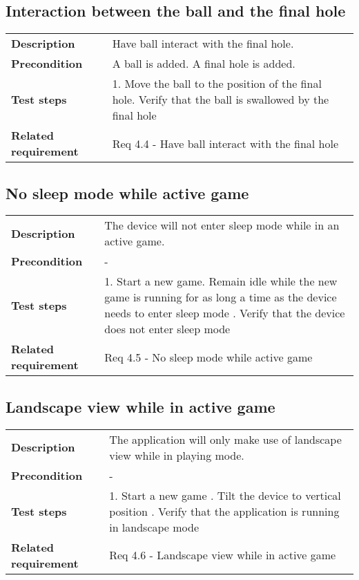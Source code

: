 \documentclass[a4paper,titlepage]{article}
\begin{document}
\subsection{Interaction between the ball and the final hole}
\begin{tabularx}{\textwidth}{lX}
	\textbf{Description}	&
		Have ball interact with the final hole.\\
	\textbf{Precondition}	&
		A ball is added.\newline
		A final hole is added.\\
	\textbf{Test steps}	&
		1. Move the ball to the position of the final hole\newline
		2. Verify that the ball is swallowed by the final hole \\
	\textbf{Related requirement}	&
		Req 4.4 - Have ball interact with the final hole \\
\end{tabularx}

\subsection{No sleep mode while active game}
\begin{tabularx}{\textwidth}{lX}
	\textbf{Description}	&
		The device will not enter sleep mode while in an active game.\\
	\textbf{Precondition}	&
		-\\
	\textbf{Test steps}	&
		1. Start a new game\newline
		2. Remain idle while the new game is running for as long a time
		   as the device needs to enter sleep mode \newline
		3. Verify that the device does not enter sleep mode \\
	\textbf{Related requirement}	&
		Req 4.5 - No sleep mode while active game \\
\end{tabularx}

\subsection{Landscape view while in active game}
\begin{tabularx}{\textwidth}{lX}
	\textbf{Description}	&
		The application will only make use of landscape view while in
		playing mode.\\
	\textbf{Precondition}	&
		-\\
	\textbf{Test steps}	&
		1. Start a new game \newline
		2. Tilt the device to vertical position \newline
		3. Verify that the application is running in landscape mode \\
	\textbf{Related requirement}	&
		Req 4.6 - Landscape view while in active game \\
\end{tabularx}
\end{document}
